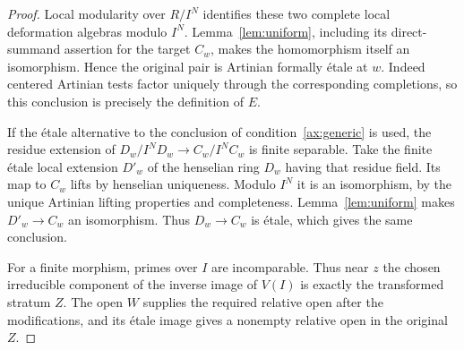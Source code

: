 \begin{proof}
Local modularity over $R/I^N$ identifies these two complete local deformation algebras modulo $I^N$. Lemma~\ref{lem:uniform}, including its direct-summand assertion for the target $C_w$, makes the homomorphism itself an isomorphism. Hence the original pair is Artinian formally \'etale at $w$. Indeed centered Artinian tests factor uniquely through the corresponding completions, so this conclusion is precisely the definition of $E$.

If the \'etale alternative to the conclusion of condition~\ref{ax:generic} is used, the residue extension of $D_w/I^ND_w\to C_w/I^NC_w$ is finite separable. Take the finite \'etale local extension $D'_w$ of the henselian ring $D_w$ having that residue field. Its map to $C_w$ lifts by henselian uniqueness. Modulo $I^N$ it is an isomorphism, by the unique Artinian lifting properties and completeness. Lemma~\ref{lem:uniform} makes $D'_w\to C_w$ an isomorphism. Thus $D_w\to C_w$ is \'etale, which gives the same conclusion.

For a finite morphism, primes over $I$ are incomparable. Thus near $z$ the chosen irreducible component of the inverse image of $V(I)$ is exactly the transformed stratum $Z$. The open $W$ supplies the required relative open after the modifications, and its \'etale image gives a nonempty relative open in the original $Z$.
\end{proof}



